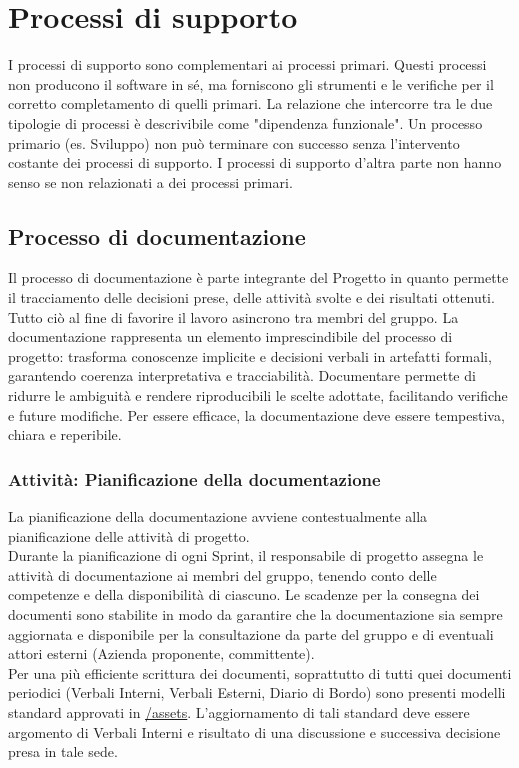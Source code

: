 \documentclass[a4paper,12pt]{article}
\begin{document}
\section{Processi di supporto} \label{processi_supporto}
I processi di supporto sono complementari ai processi primari. Questi processi
non producono il software in sé, ma forniscono gli strumenti e le verifiche per
il corretto completamento di quelli primari. La relazione che intercorre tra le
due tipologie di processi è descrivibile come "dipendenza funzionale". Un
processo primario (es. Sviluppo) non può terminare con successo senza
l'intervento costante dei processi di supporto. I processi di supporto d'altra
parte non hanno senso se non relazionati a dei processi primari.

\subsection{Processo di documentazione} \label{documentazione}
Il processo di documentazione è parte integrante del Progetto in quanto
permette il tracciamento delle decisioni prese, delle attività svolte e dei
risultati ottenuti. Tutto ciò al fine di favorire il lavoro asincrono tra
membri del gruppo. La documentazione rappresenta un elemento imprescindibile
del processo di progetto: trasforma conoscenze implicite e decisioni verbali in
artefatti formali, garantendo coerenza interpretativa e tracciabilità.
Documentare permette di ridurre le ambiguità e rendere riproducibili le scelte
adottate, facilitando verifiche e future modifiche. Per essere efficace, la
documentazione deve essere tempestiva, chiara e reperibile.

\subsubsection{Attività: Pianificazione della documentazione} \label{pianificazioneDocs}
La pianificazione della documentazione avviene contestualmente alla
pianificazione delle attività di progetto. \\Durante la pianificazione di ogni
Sprint, il responsabile di progetto assegna le attività di documentazione ai
membri del gruppo, tenendo conto delle competenze e della disponibilità di
ciascuno. Le scadenze per la consegna dei documenti sono stabilite in modo da
garantire che la documentazione sia sempre aggiornata e disponibile per la
consultazione da parte del gruppo e di eventuali attori esterni (Azienda
proponente, committente). \\Per una più efficiente scrittura dei documenti,
soprattutto di tutti quei documenti periodici (Verbali Interni, Verbali
Esterni, Diario di Bordo) sono presenti modelli standard approvati in
\href{https://github.com/7-ZPUs/Docs/tree/main/assets}{/assets}.
L'aggiornamento di tali standard deve essere argomento di Verbali Interni e
risultato di una discussione e successiva decisione presa in tale sede.
\end{document}

